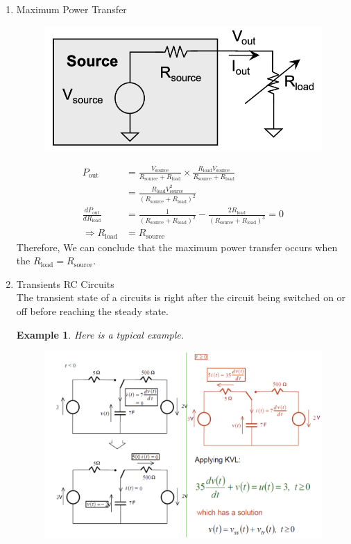 \documentclass{article}
\newtheorem{exam}{Example}
\begin{document}
\begin{enumerate}
        \item Maximum Power Transfer
        \begin{figure}[h]
            \centering
            \includegraphics[width=0.75\linewidth]{image/powersource.png}
        \end{figure}
        \begin{align*}
        P_{\text{out}} &= \frac{V_{\text{source}}}{R_{\text{source}} + R_{\text{load}}} \times \frac{R_{\text{load}} V_{\text{source}}}{R_{\text{source}} + R_{\text{load}}} \\
        &= \frac{R_{\text{load}} V_{\text{source}}^2}{(R_{\text{source}} + R_{\text{load}})^2} \\
        \frac{dP_{\text{out}}}{dR_{\text{load}}} &= \frac{1}{(R_{\text{source}} + R_{\text{load}})^2} - \frac{2R_{\text{load}}}{(R_{\text{source}} + R_{\text{load}})^3} = 0 \\
        \Rightarrow R_{\text{load}} &= R_{\text{source}}
        \end{align*}
        Therefore, We can conclude that the maximum power transfer occurs when the $R_{\text{load}} = R_{\text{source}}$.
        \item Transients RC Circuits\\
        The transient state of a circuits is right after the circuit being switched on or off before reaching the steady state.
        \begin{exam}
            Here is a typical example.
            \begin{figure}[h]
                \centering
                \includegraphics[width=0.75\linewidth]{image/transient.png}

\end{figure}
\end{exam}
\end{enumerate}
\end{document}
